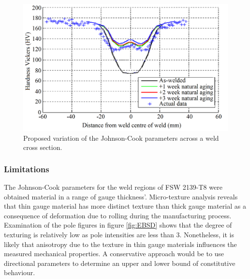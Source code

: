 	\begin{figure}
		\includegraphics[width=1\linewidth]{HardnessVariation} 
		\caption{Proposed variation of the Johnson-Cook parameters across a weld cross section.}
		\label{fig:HardnessVar}
	\end{figure}	
	
	\subsubsection{Limitations}
	The Johnson-Cook parameters for the weld regions of FSW 2139-T8 were obtained material in a range of gauge thickness'. 
	Micro-texture analysis reveals that thin gauge material has more distinct texture than thick gauge material as a consequence of deformation due to rolling during the manufacturing process. Examination of the pole figures in figure \ref{fig:EBSD} shows that the degree of texturing is relatively low as pole intensities are less than 3. Nonetheless, it is likely that anisotropy due to the texture in thin gauge materials influences the measured mechanical properties. A conservative approach would be to use directional parameters to determine an upper and lower bound of constitutive behaviour.
	
	
